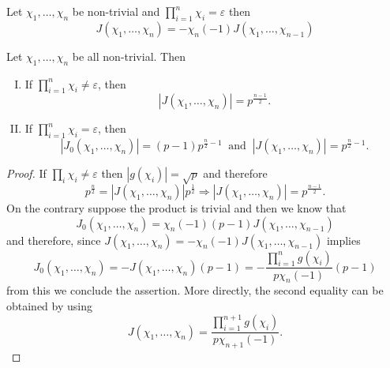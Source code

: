 \begin{corollary}
    Let \(\chi_1,\dots,\chi_n\) be non-trivial and \(\prod_{i=1}^n \chi_i =
    \varepsilon\) then
    \[
        J(\chi_1, \dots, \chi_n) = -\chi_n(-1) J(\chi_1,\dots,\chi_{n-1})
    \]
\end{corollary}

\begin{theorem}
    Let \(\chi_1, \dots, \chi_n\) be all non-trivial. Then
    \begin{enumerate}[I.]
        \item If \(\prod_{i=1}^n \chi_i \neq  \varepsilon\), then
              \[
                  |J(\chi_1, \dots, \chi_n)| = p^{\frac{n-1}{2}}.
              \]
        \item If \(\prod_{i=1}^n \chi_i = \varepsilon\), then
              \[
                  |J_0(\chi_1, \dots, \chi_n)| = (p-1)p^{\frac{n}{2} - 1}\ \text{ and
                  }\ |J(\chi_1,\dots, \chi_n)| = p^{\frac{n}{2} - 1}.
              \]
    \end{enumerate}
\end{theorem}

\begin{proof}
    If \(\prod_i \chi_i \neq  \varepsilon\) then \(|g(\chi_i)| = \sqrt{p}  \) and
    therefore
    \[
        p^{\frac{n}{2}} = |J(\chi_1, \dots, \chi_n)| p^{\frac{1}{2}}
        \Rightarrow  |J(\chi_1, \dots, \chi_n)| = p^{\frac{n-1}{2}}.
    \]
    On the contrary suppose the product is trivial and then we know that
    \[
        J_0(\chi_1,\dots,\chi_n) = \chi_n(-1) (p-1) J(\chi_1, \dots, \chi_{n-1})
    \]
    and therefore, since \(J(\chi_1, \dots, \chi_n) = -\chi_n(-1)
    J(\chi_1,\dots,\chi_{n-1})\) implies
    \[
        J_0(\chi_1,\dots, \chi_n) = - J(\chi_1, \dots, \chi_n) (p-1) = -
        \frac{\prod_{i=1}^{n}g(\chi_i)}{p \chi_n(-1)} (p-1)
    \]
    from this we conclude the assertion. More directly, the second equality can
    be obtained by using
    \[
        J(\chi_1,\dots,\chi_n) = \frac{\prod_{i=1}^{n+1}
            g(\chi_i)}{p\chi_{n+1}(-1)}.
    \]
\end{proof}

